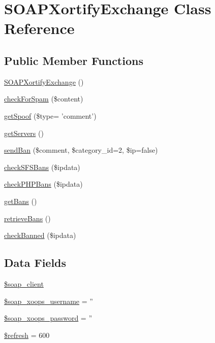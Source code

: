 \hypertarget{class_s_o_a_p_xortify_exchange}{\section{S\-O\-A\-P\-Xortify\-Exchange Class Reference}
\label{class_s_o_a_p_xortify_exchange}
}
\subsection*{Public Member Functions}
\begin{DoxyCompactItemize}
\item 
\hyperlink{class_s_o_a_p_xortify_exchange_add339868d9ad9a22afe8c95564aa063a}{S\-O\-A\-P\-Xortify\-Exchange} ()
\item 
\hyperlink{class_s_o_a_p_xortify_exchange_a7a4f53c3841dc7806455261af557d514}{check\-For\-Spam} (\$content)
\item 
\hyperlink{class_s_o_a_p_xortify_exchange_ae7926cba79660f77479306100f492c03}{get\-Spoof} (\$type= 'comment')
\item 
\hyperlink{class_s_o_a_p_xortify_exchange_a882f365bc81e207dc2123ef707735e82}{get\-Servers} ()
\item 
\hyperlink{class_s_o_a_p_xortify_exchange_a0293acfa4afe0cb5b2816352a35d8ca7}{send\-Ban} (\$comment, \$category\-\_\-id=2, \$ip=false)
\item 
\hyperlink{class_s_o_a_p_xortify_exchange_a985a563a84e3e5c54694fcce192bda53}{check\-S\-F\-S\-Bans} (\$ipdata)
\item 
\hyperlink{class_s_o_a_p_xortify_exchange_aeb1bf9aaee4718870adbd07333490aaf}{check\-P\-H\-P\-Bans} (\$ipdata)
\item 
\hyperlink{class_s_o_a_p_xortify_exchange_aea26db2906896833d32445a698fc4cdc}{get\-Bans} ()
\item 
\hyperlink{class_s_o_a_p_xortify_exchange_a4af29af927aae9aada97ef0c2cd08fa1}{retrieve\-Bans} ()
\item 
\hyperlink{class_s_o_a_p_xortify_exchange_ae41df0f26620b727f7f63342648f6474}{check\-Banned} (\$ipdata)
\end{DoxyCompactItemize}
\subsection*{Data Fields}
\begin{DoxyCompactItemize}
\item 
\hyperlink{class_s_o_a_p_xortify_exchange_a18c3d5ef7b606d5f21c8fda9d08e8c7e}{\$soap\-\_\-client}
\item 
\hyperlink{class_s_o_a_p_xortify_exchange_ab46ae973f580890282bce8dbe346abab}{\$soap\-\_\-xoops\-\_\-username} = ''
\item 
\hyperlink{class_s_o_a_p_xortify_exchange_ac116a126fa48c572acc0a859f42fa8dc}{\$soap\-\_\-xoops\-\_\-password} = ''
\item 
\hyperlink{class_s_o_a_p_xortify_exchange_a8527f826b6959aaa92b0e51ee427ba1a}{\$refresh} = 600
\end{DoxyCompactItemize}


